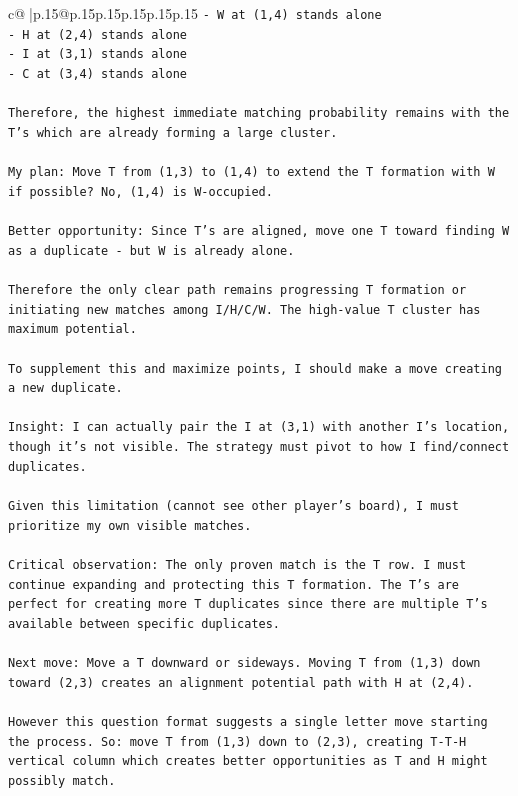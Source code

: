 \documentclass{article}
\begin{document}
{\begin{supertabular}{c@{$\;$}|p{.15\linewidth}@{}p{.15\linewidth}p{.15\linewidth}p{.15\linewidth}p{.15\linewidth}p{.15\linewidth}}
{{{\texttt{{-} W at (1,4) stands alone} \\
\texttt{{-} H at (2,4) stands alone} \\
\texttt{{-} I at (3,1) stands alone} \\
\texttt{{-} C at (3,4) stands alone} \\
\\ 
\texttt{Therefore, the highest immediate matching probability remains with the T's which are already forming a large cluster.} \\
\\ 
\texttt{My plan: Move T from (1,3) to (1,4) to extend the T formation with W if possible? No, (1,4) is W{-}occupied. } \\
\\ 
\texttt{Better opportunity: Since T's are aligned, move one T toward finding W as a duplicate {-} but W is already alone.} \\
\\ 
\texttt{Therefore the only clear path remains progressing T formation or initiating new matches among I/H/C/W. The high{-}value T cluster has maximum potential.} \\
\\ 
\texttt{To supplement this and maximize points, I should make a move creating a new duplicate.} \\
\\ 
\texttt{Insight: I can actually pair the I at (3,1) with another I's location, though it's not visible. The strategy must pivot to how I find/connect duplicates.} \\
\\ 
\texttt{Given this limitation (cannot see other player's board), I must prioritize my own visible matches.} \\
\\ 
\texttt{Critical observation: The only proven match is the T row. I must continue expanding and protecting this T formation. The T's are perfect for creating more T duplicates since there are multiple T's available between specific duplicates.} \\
\\ 
\texttt{Next move: Move a T downward or sideways. Moving T from (1,3) down toward (2,3) creates an alignment potential path with H at (2,4).} \\
\\ 
\texttt{However this question format suggests a single letter move starting the process. So: move T from (1,3) down to (2,3), creating T{-}T{-}H vertical column which creates better opportunities as T and H might possibly match.} \\
}}}
\end{supertabular}}
\end{document}
